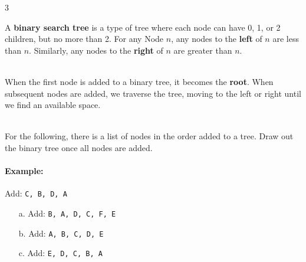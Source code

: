 \documentclass[a4paper,12pt,oneside]{book}
\newcounter{question}
\begin{document}
        \begin{question}{\thequestion}{3}

            A \textbf{binary search tree} is a type of tree where each node
            can have 0, 1, or 2 children, but no more than 2.
            For any Node $n$, any nodes to the \textbf{left} of $n$ are less than $n$.
            Similarly, any nodes to the \textbf{right} of $n$ are greater than $n$.

            ~\\
            When the first node is added to a binary tree, it becomes the \textbf{root}.
            When subsequent nodes are added, we traverse the tree, moving to the left
            or right until we find an available space.

            ~\\
            For the following, there is a list of nodes in the order added to a tree.
            Draw out the binary tree once all nodes are added.

            \paragraph{Example:}
                Add: \texttt{C, B, D, A} ~\\
                

            \begin{itemize}
                \item[a.]   Add: \texttt{B, A, D, C, F, E}
                    \solution{}{ \vspace{3cm} }
                    
                \item[b.]   Add: \texttt{A, B, C, D, E}
                    \solution{}{ \vspace{3cm} }
                    
                \item[c.]   Add: \texttt{E, D, C, B, A}
                    \solution{}{ \vspace{3cm} }
                    
            \end{itemize}
        

            
        \end{question}
\end{document}
